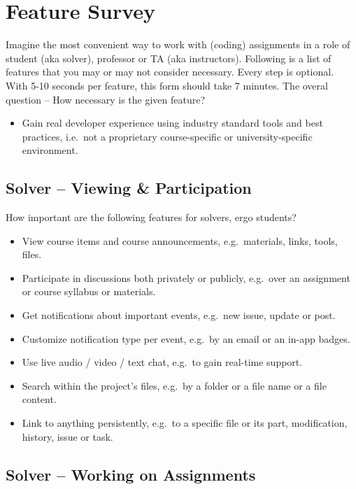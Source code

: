 \chapter{Feature Survey} \label{app:survey}

Imagine the most convenient way to work with (coding) assignments in a role of student (aka solver), professor or TA (aka instructors). Following is a list of features that you may or may not consider necessary. Every step is optional. With 5-10 seconds per feature, this form should take 7 minutes. The overal question -- How necessary is the given feature?

\begin{itemize}
\item
  Gain real developer experience using industry standard tools and best practices, i.e.~not a proprietary course-specific or university-specific environment.
\end{itemize}

\section{Solver -- Viewing \& Participation}\label{sec:solver-viewing-participation}

How important are the following features for solvers, ergo students?

\begin{itemize}
\item
  View course items and course announcements, e.g.~materials, links, tools, files.
\item
  Participate in discussions both privately or publicly, e.g.~over an assignment or course syllabus or materials.
\item
  Get notifications about important events, e.g.~new issue, update or post.
\item
  Customize notification type per event, e.g.~by an email or an in-app badges.
\item
  Use live audio / video / text chat, e.g.~to gain real-time support.
\item
  Search within the project's files, e.g.~by a folder or a file name or a file content.
\item
  Link to anything persistently, e.g.~to a specific file or its part, modification, history, issue or task.
\end{itemize}

\section{Solver -- Working on Assignments}\label{sec:solver-working-on-assignments}


